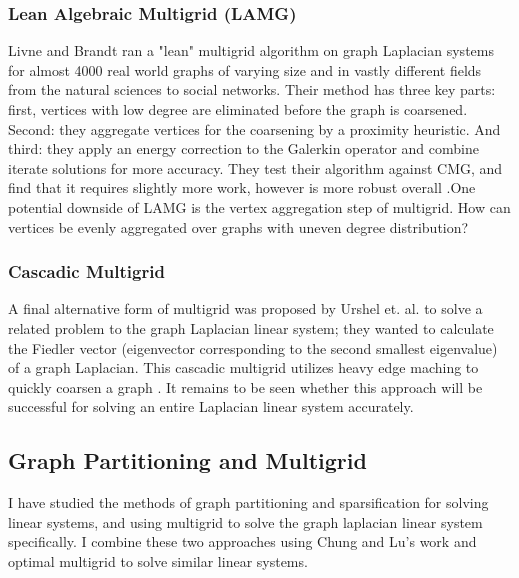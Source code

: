 \documentclass{article}
\begin{document}
\subsubsection{Lean Algebraic Multigrid (LAMG)}
Livne and Brandt ran a "lean" multigrid algorithm on graph Laplacian systems for almost 4000 real world graphs of varying size and in vastly different fields from the natural sciences to social networks. Their method has three key parts: first, vertices with low degree are eliminated before the graph is coarsened. Second: they aggregate vertices for the coarsening by a proximity heuristic. And third: they apply an energy correction to the Galerkin operator and combine iterate solutions for more accuracy. They test their algorithm against CMG, and find that it requires slightly more work, however is more robust overall \cite{Livne:2012}.One potential downside of LAMG is the vertex aggregation step of multigrid. How can vertices be evenly aggregated over graphs with uneven degree distribution?


\subsubsection{Cascadic Multigrid}
A final alternative form of multigrid was proposed by Urshel et. al. to solve a related problem to the graph Laplacian linear system; they wanted to calculate the Fiedler vector (eigenvector corresponding to the second smallest eigenvalue) of a graph Laplacian. This cascadic multigrid utilizes heavy edge maching to quickly coarsen a graph \cite{Urschel:2014}. It remains to be seen whether this approach will be successful for solving an entire Laplacian linear system accurately.

\subsection{Graph Partitioning and Multigrid}
I have studied the methods of graph partitioning and sparsification for solving linear systems, and using multigrid to solve the graph laplacian linear system specifically. I combine these two approaches using Chung and Lu's work \cite{Chung:2004} and optimal multigrid to solve similar linear systems.
%
%
\end{document}
